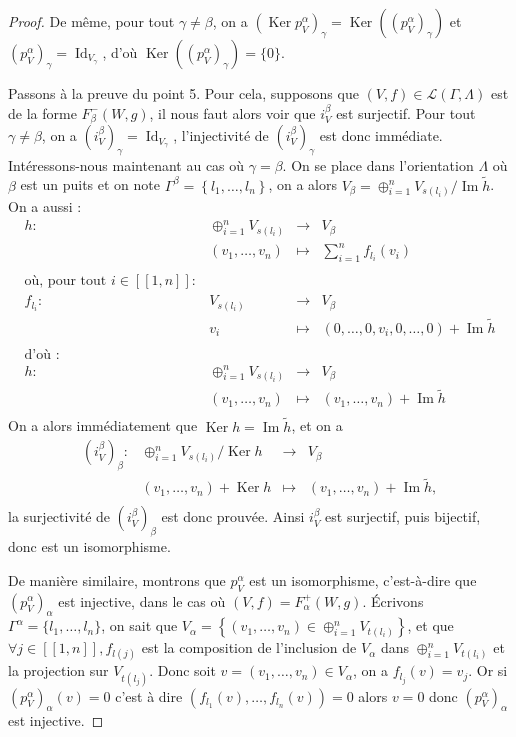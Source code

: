 \documentclass[a4paper,11pt]{article}
\DeclareMathOperator{\Ker}{Ker}
\DeclareMathOperator{\Id}{Id}
\DeclareMathOperator{\Img}{Im}
\begin{document}
\begin{proof}
        De même, pour tout $\gamma\neq\beta$, on a $(\Ker p_{V}^{\alpha})_{\gamma}=\Ker((p_{V}^{\alpha})_{\gamma})$ et $(p_{V}^{\alpha})_{\gamma}=\Id_{V_{\gamma}}$, d'où $\Ker((p_{V}^{\alpha})_{\gamma})=\{0\}$.

	Passons à la preuve du point 5. Pour cela, supposons que $(V,f)\in\mathscr{L}(\Gamma,\Lambda)$ est de la forme $F_{\beta}^{-}(W,g)$, il nous faut alors voir que $i_{V}^{\beta}$ est surjectif. Pour tout $\gamma\neq\beta$, on a $(i_{V}^{\beta})_{\gamma}=\Id_{V_{\gamma}}$, l'injectivité de $(i_{V}^{\beta})_{\gamma}$ est donc immédiate. Intéressons-nous maintenant au cas où $\gamma=\beta$. On se place dans l'orientation $\Lambda$ où $\beta$ est un puits et on note $\Gamma^{\beta}=\left\{ l_{1},\dots,l_{n} \right\}$, on a alors $V_{\beta}=\oplus_{i=1}^{n}V_{s(l_{i})}/\Img \widetilde{h}$. On a aussi :
	\[
\begin{array}{rccc}
	h: & \oplus_{i=1}^{n}V_{s(l_{i})} & \rightarrow & V_{\beta} \\
	& (v_{1},\dots,v_{n}) & \mapsto & \sum_{i=1}^{n}f_{l_{i}}(v_{i})\\
	&&&\\
	\text{où, pour tout }i\in[\![1,n]\!] : &&&\\
	f_{l_{i}}:& V_{s(l_{i})} & \rightarrow & V_{\beta} \\
	& v_{i} & \mapsto & (0,\dots,0,v_{i},0,\dots,0)+\Img \widetilde{h}\\
	&&&\\
	\text{d'où :} &&&\\
	h: & \oplus_{i=1}^{n}V_{s(l_{i})} & \rightarrow & V_{\beta} \\
	& (v_{1},\dots,v_{n}) & \mapsto & (v_{1},\dots,v_{n}) + \Img \widetilde{h}\\
\end{array}
	\]
	On a alors immédiatement que $\Ker h = \Img \widetilde{h}$, et on a
	\[
		\begin{array}{rccc}
			(i_{V}^{\beta})_{\beta} : & \oplus_{i=1}^{n}V_{s(l_{i})}/\Ker h & \rightarrow & V_{\beta}\\
			& (v_{1},\dots,v_{n})+\Ker h & \mapsto & (v_{1},\dots,v_{n})+\Img \widetilde{h},\\
		\end{array}
	\]
	la surjectivité de $(i_{V}^{\beta})_{\beta}$ est donc prouvée. Ainsi $i_{V}^{\beta}$ est surjectif, puis bijectif, donc est un isomorphisme.

        De manière similaire, montrons que $p_{V}^{\alpha}$ est un isomorphisme, c'est-à-dire que $(p_{V}^{\alpha})_{\alpha}$ est injective, dans le cas où $(V,f) = F_{\alpha}^{+}(W,g)$. Écrivons $\Gamma^{\alpha} = \{l_{1}, \dots, l_{n}\}$, on sait que $V_{\alpha} = \left\{ (v_{1}, \dots, v_{n}) \in \oplus_{i=1}^{n}  V_{t(l_{i})}\right\}$, et que $\forall j \in [\![1,n]\!] , f_{l(j)}$ est la composition de l'inclusion de $V_{\alpha}$ dans $\oplus_{i=1}^{n}V_{t(l_{i})}$ et la projection sur $V_{t(l_{j})}$. Donc soit $v= (v_{1}, \dots, v_{n}) \in V_{\alpha}$, on a $ f_{l_{j}}(v) = v_{j}$. Or si $(p_{V}^{\alpha})_{\alpha}(v) = 0 $ c'est à dire $(f_{l_{1}}(v), \dots, f_{l_{n}}(v)) = 0 $ alors $v = 0$ donc $(p_{V}^{\alpha})_{\alpha}$ est injective.



\end{proof}
\end{document}
